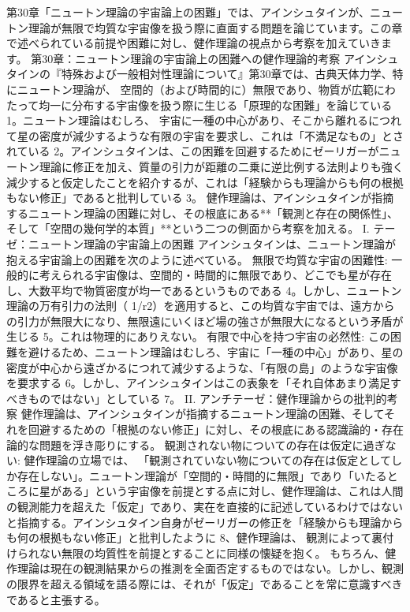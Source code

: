 \documentclass{article}
\begin{document}
第30章「ニュートン理論の宇宙論上の困難」では、アインシュタインが、ニュートン理論が無限で均質な宇宙像を扱う際に直面する問題を論じています。この章で述べられている前提や困難に対し、健作理論の視点から考察を加えていきます。
第30章：ニュートン理論の宇宙論上の困難への健作理論的考察
アインシュタインの『特殊および一般相対性理論について』第30章では、古典天体力学、特にニュートン理論が、
空間的（および時間的に）無限であり、物質が広範にわたって均一に分布する宇宙像を扱う際に生じる「原理的な困難」を論じている 1。ニュートン理論はむしろ、
宇宙に一種の中心があり、そこから離れるにつれて星の密度が減少するような有限の宇宙を要求し、これは「不満足なもの」とされている 2。アインシュタインは、この困難を回避するためにゼーリガーがニュートン理論に修正を加え、質量の引力が距離の二乗に逆比例する法則よりも強く減少すると仮定したことを紹介するが、これは「経験からも理論からも何の根拠もない修正」であると批判している 3。
健作理論は、アインシュタインが指摘するニュートン理論の困難に対し、その根底にある**「観測と存在の関係性」、そして「空間の幾何学的本質」**という二つの側面から考察を加える。
I. テーゼ：ニュートン理論の宇宙論上の困難
アインシュタインは、ニュートン理論が抱える宇宙論上の困難を次のように述べている。
無限で均質な宇宙の困難性:
一般的に考えられる宇宙像は、空間的・時間的に無限であり、どこでも星が存在し、大数平均で物質密度が均一であるというものである 4。しかし、ニュートン理論の万有引力の法則（
1/r2）を適用すると、この均質な宇宙では、遠方からの引力が無限大になり、無限遠にいくほど場の強さが無限大になるという矛盾が生じる 5。これは物理的にありえない。
有限で中心を持つ宇宙の必然性:
この困難を避けるため、ニュートン理論はむしろ、宇宙に「一種の中心」があり、星の密度が中心から遠ざかるにつれて減少するような、「有限の島」のような宇宙像を要求する 6。しかし、アインシュタインはこの表象を「それ自体あまり満足すべきものではない」としている 7。
II. アンチテーゼ：健作理論からの批判的考察
健作理論は、アインシュタインが指摘するニュートン理論の困難、そしてそれを回避するための「根拠のない修正」に対し、その根底にある認識論的・存在論的な問題を浮き彫りにする。
観測されない物についての存在は仮定に過ぎない:
健作理論の立場では、
「観測されていない物についての存在は仮定としてしか存在しない」。ニュートン理論が「空間的・時間的に無限」であり「いたるところに星がある」という宇宙像を前提とする点に対し、健作理論は、これは人間の観測能力を超えた「仮定」であり、実在を直接的に記述しているわけではないと指摘する。アインシュタイン自身がゼーリガーの修正を「経験からも理論からも何の根拠もない修正」と批判したように 8、健作理論は、
観測によって裏付けられない無限の均質性を前提とすることに同様の懐疑を抱く。
もちろん、健作理論は現在の観測結果からの推測を全面否定するものではない。しかし、観測の限界を超える領域を語る際には、それが「仮定」であることを常に意識すべきであると主張する。
\end{document}
